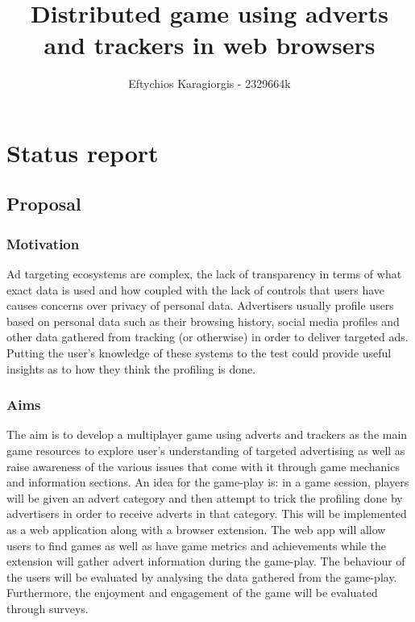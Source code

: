 \documentclass[11pt]{article}
\title{ Distributed game using adverts and trackers in web browsers}
\author{ Eftychios Karagiorgis - 2329664k }
\begin{document}
    \maketitle
    
    
     

\section{Status report}

\subsection{Proposal}\label{proposal}

\subsubsection{Motivation}\label{motivation}

Ad targeting ecosystems are complex, the lack of transparency in terms of what exact data is used and how coupled with the lack of controls that users have causes concerns over privacy of personal data. Advertisers usually profile users based on personal data such as their browsing history, social media profiles and other data gathered from tracking (or otherwise) in order to deliver targeted ads. Putting the user's knowledge of these systems to the test could provide useful insights as to how they think the profiling is done. 

\subsubsection{Aims}\label{aims}

The aim is to develop a multiplayer game using adverts and trackers as the main game resources to explore user's understanding of targeted advertising as well as raise awareness of the various issues that come with it through game mechanics and information sections. An idea for the game-play is: in a game session, players will be given an advert category and then attempt to trick the profiling done by advertisers in order to receive adverts in that category. This will be implemented as a web application along with a browser extension. The web app will allow users to find games as well as have game metrics and achievements while the extension will gather advert information during the game-play. The behaviour of the users will be evaluated by analysing the data gathered from the game-play. Furthermore, the enjoyment and engagement of the game will be evaluated through surveys.
\end{document}
